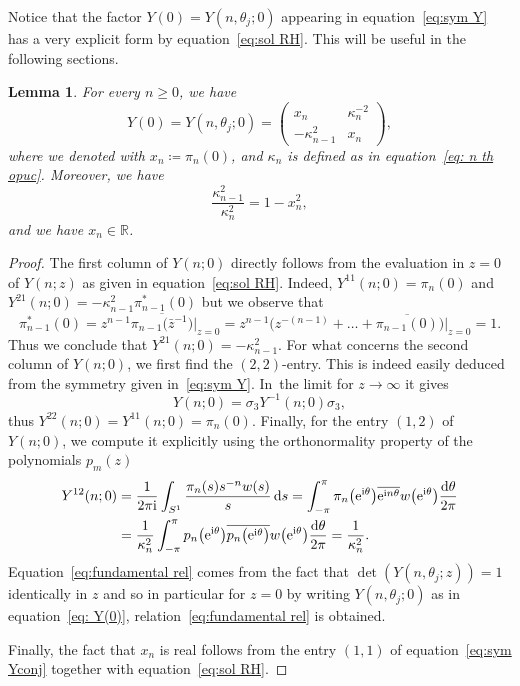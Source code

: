 \documentclass[pdftex]{sigma}%
\numberwithin{equation}{section}
\newtheorem{Lemma}[Theorem]{Lemma}
\def\e{\mathrm{e}}
\begin{document}
Notice that the factor $Y(0)=Y(n, \theta_j;0)$ appearing in equation~\eqref{eq:sym Y} has a very explicit form by equation~\eqref{eq:sol RH}. This will be useful in the following sections.
	\begin{Lemma}
		For every $n\geq 0$, we have
		\begin{equation}
			\label{eq: Y(0)}
			Y(0)=Y(n,\theta_j;0)=\begin{pmatrix}
				x_n&\kappa_{n}^{-2}\\
				-\kappa^2_{n-1}&x_n
			\end{pmatrix}\!,
		\end{equation}
		where we denoted with $x_n\coloneqq\pi_n(0)$, and $\kappa_n$ is defined as in equation~\eqref{eq: n th opuc}. Moreover, we have
		\begin{equation}
			\label{eq:fundamental rel}
			\frac{\kappa_{n-1}^2}{\kappa_n^2}=1-x_n^2,
		\end{equation}
	and we have $x_n \in \mathbb{R}$.
	\end{Lemma}
	\begin{proof}
		The first column of $Y(n;0)$ directly follows from the evaluation in $z=0$ of $Y(n;z)$ as given in equation~\eqref{eq:sol RH}. Indeed, $Y^{11}(n;0)=\pi_{n}(0)$ and $Y^{21}(n;0)= -\kappa_{n-1}^2\pi^*_{n-1}(0)$ but we observe that
		\begin{equation*}
			\pi^*_{n-1}(0) = z^{n-1}\overline{\pi_{n-1}\big(\bar{z}^{-1}\big)}\big\vert_{z=0} = z^{n-1}\big(z^{-(n-1)}+\dots +\overline{\pi_{n-1}(0)}\big)\big\vert_{z=0}=1.
		\end{equation*}
		Thus we conclude that $Y^{21}(n;0)= -\kappa_{n-1}^2$. For what concerns the second column of $Y(n;0)$, we first find the $(2,2)$-entry. This is indeed easily deduced from the symmetry given in~\eqref{eq:sym Y}. In~the limit for $z\rightarrow \infty$ it gives
		\begin{equation*}
			Y(n;0)=\sigma_3Y^{-1}(n;0)\sigma_3,
		\end{equation*}
		thus $Y^{22}(n;0)=Y^{11}(n;0)=\pi_n(0)$. Finally, for the entry $(1,2)$ of $Y(n;0)$, we compute it explicitly using the orthonormality property of the polynomials $p_m(z)$
		\begin{align*}
Y^{12}(n;0)&= \frac{1}{2\pi {\rm i}}\int_{S^1}\frac{\pi_n(s)s^{-n}w(s)}{s}\,{\rm d}s = \int_{-\pi}^{\pi}\pi_n\big(\e^{{\rm i}\theta}\big)\overline{\e^{{\rm i} n \theta}}w\big(\e^{{\rm i}\theta}\big)\frac{{\rm d}\theta}{2\pi}
\\
&= \frac{1}{\kappa_n^2}\int_{-\pi}^{\pi}p_n\big(\e^{{\rm i}\theta}\big)\overline{p_n\big(\e^{{\rm i}\theta}\big)}w\big(\e^{{\rm i}\theta}\big)\frac{{\rm d}\theta}{2\pi}=\frac{1}{\kappa_n^2}.	
	\end{align*}
		Equation~\eqref{eq:fundamental rel} comes from the fact that $\det(Y(n,\theta_j;z))=1$ identically in $z$ and so in particular for $z=0$ by writing $Y(n,\theta_j;0)$ as in equation~\eqref{eq: Y(0)}, relation~\eqref{eq:fundamental rel} is obtained.
		
		Finally, the fact that $x_n$ is real follows from the entry $(1,1)$ of equation~\eqref{eq:sym Yconj} together with equation~\eqref{eq:sol RH}.
	\end{proof}
\end{document}
